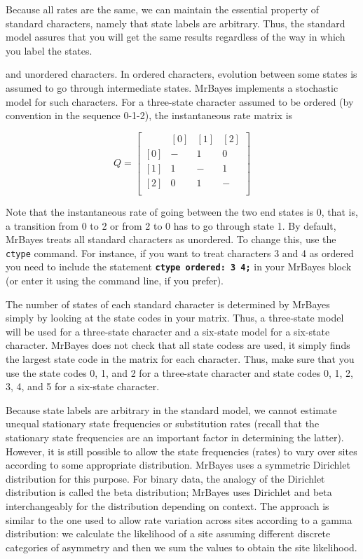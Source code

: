 \documentclass[12pt]{book}
\newcommand{\ttt}[1]{\texttt{#1} }
\newcommand{\tb}[1]{\ttt{\textbf{#1}} }
\begin{document}
Because all rates are the same, we can maintain the essential property of standard
characters, namely that state labels are arbitrary. Thus, the standard model assures that
you will get the same results regardless of the way in which you label the states.

and unordered characters. In ordered characters, evolution between some states is
assumed to go through intermediate states. MrBayes implements a stochastic model for
such characters. For a three-state character assumed to be ordered (by convention in the
sequence 0-1-2), the instantaneous rate matrix is

\[
Q=\begin{bmatrix}
    & [0] & [1] & [2]\\ 
 [0]& - & 1 & 0\\ 
 [1]& 1& -  & 1\\ 
 [2]& 0& 1  & -\\ 
\end{bmatrix}
\]

Note that the instantaneous rate of going between the two end states is 0, that is, a transition
from 0 to 2 or from 2 to 0 has to go through state 1. By default, MrBayes treats all standard
characters as unordered. To change this, use the \ttt{ctype} command. For instance, if you want to
treat characters 3 and 4 as ordered you need to include the statement \tb{ctype ordered: 3 4;} in
your MrBayes block (or enter it using the command line, if you prefer).

The number of states of each standard character is determined by MrBayes simply by looking at the
state codes in your matrix. Thus, a three-state model will be used for a three-state character and
a six-state model for a six-state character. MrBayes does not check that all state codess are used,
it simply finds the largest state code in the matrix for each character. Thus, make sure that you
use the state codes 0, 1, and 2 for a three-state character and state codes 0, 1, 2, 3, 4, and 5
for a six-state character.

Because state labels are arbitrary in the standard model, we cannot estimate unequal stationary
state frequencies or substitution rates (recall that the stationary state frequencies are an
important factor in determining the latter). However, it is still possible to allow the state
frequencies (rates) to vary over sites according to some appropriate distribution. MrBayes uses a
symmetric Dirichlet distribution for this purpose. For binary data, the analogy of the Dirichlet
distribution is called the beta distribution; MrBayes uses Dirichlet and beta interchangeably for
the distribution depending on context. The approach is similar to the one used to allow rate
variation across sites according to a gamma distribution: we calculate the likelihood of a site
assuming different discrete categories of asymmetry and then we sum the values to obtain the site
likelihood.
\end{document}
